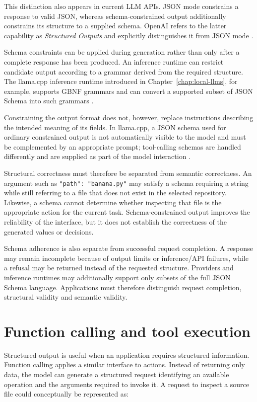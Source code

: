 This distinction also appears in current LLM APIs. JSON mode constrains a response to valid JSON, whereas schema-constrained output additionally constrains its structure to a supplied schema. OpenAI refers to the latter capability as \emph{Structured Outputs} and explicitly distinguishes it from JSON mode \parencite{openai-structured-outputs}.

Schema constraints can be applied during generation rather than only after a complete response has been produced. An inference runtime can restrict candidate output according to a grammar derived from the required structure. The llama.cpp inference runtime introduced in Chapter~\ref{chap:local-llms}, for example, supports GBNF grammars and can convert a supported subset of JSON Schema into such grammars \parencite{ggml-grammars}.

Constraining the output format does not, however, replace instructions describing the intended meaning of its fields. In llama.cpp, a JSON schema used for ordinary constrained output is not automatically visible to the model and must be complemented by an appropriate prompt; tool-calling schemas are handled differently and are supplied as part of the model interaction \parencite{ggml-grammars}.

Structural correctness must therefore be separated from semantic correctness. An argument such as \texttt{"path": "banana.py"} may satisfy a schema requiring a string while still referring to a file that does not exist in the selected repository. Likewise, a schema cannot determine whether inspecting that file is the appropriate action for the current task. Schema-constrained output improves the reliability of the interface, but it does not establish the correctness of the generated values or decisions.

Schema adherence is also separate from successful request completion. A response may remain incomplete because of output limits or inference/API failures, while a refusal may be returned instead of the requested structure. Providers and inference runtimes may additionally support only subsets of the full JSON Schema language. Applications must therefore distinguish request completion, structural validity and semantic validity.

\section{Function calling and tool execution}
\label{sec:function-calling}

Structured output is useful when an application requires structured information. Function calling applies a similar interface to actions. Instead of returning only data, the model can generate a structured request identifying an available operation and the arguments required to invoke it. A request to inspect a source file could conceptually be represented as:

